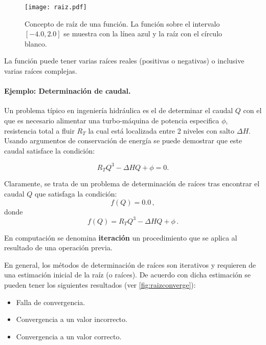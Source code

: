 \begin{figure}[H]
	\centering
	\texttt{[image: raiz.pdf]}
	\caption{Concepto de raíz de una función. La función sobre el intervalo $[-4.0, 2.0]$ se muestra con la línea azul y la raíz con el círculo blanco.}
	\label{fig:raiz}
\end{figure}


La función puede tener varias raíces reales (positivas o negativas) o inclusive varias raíces complejas.

\paragraph{Ejemplo: Determinación de caudal.}
Un problema típico en ingeniería hidráulica es el de determinar el caudal $Q$ 
con el que es necesario alimentar una turbo-máquina de potencia especifica
$\phi$, resistencia total a fluir $R_T$ la cual está localizada entre 2 niveles 
con salto $\Delta H$. Usando argumentos de conservación de energía se puede 
demostrar que este caudal satisface la condición:

\begin{equation}
	{R_T}{Q^3} - \Delta HQ + \phi  = 0.
\label{caudal}
\end{equation}

Claramente, se trata de un problema de determinación de raíces tras encontrar 
el caudal $Q$ que satisfaga la condición:
\[f(Q) = 0.0\, ,\]
donde
\begin{equation}
f(Q) ={R_T}{Q^3} - \Delta HQ + \phi\, .
\label{caudalF}
\end{equation}

\begin{tcolorbox}
En computación se denomina \textbf{iteración} un procedimiento que se aplica al 
resultado de una operación previa.
\end{tcolorbox}

En general, los métodos de determinación de raíces son iterativos y requieren 
de una estimación inicial de la raíz (o raíces). De acuerdo con dicha 
estimación se pueden tener los siguientes resultados (ver 
\cref{fig:raizconverge}):
\begin{itemize}
	\item Falla de convergencia.
	\item Convergencia a un valor incorrecto.
	\item Convergencia a un valor correcto.
\end{itemize}

